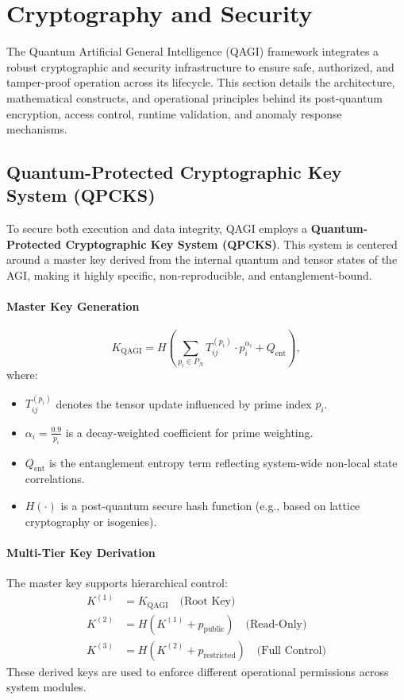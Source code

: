 \documentclass{article}
\theoremstyle{plain}
\theoremstyle{claimstyle}
\begin{document}
\section{Cryptography and Security}

The Quantum Artificial General Intelligence (QAGI) framework integrates a robust cryptographic and security infrastructure to ensure safe, authorized, and tamper-proof operation across its lifecycle. This section details the architecture, mathematical constructs, and operational principles behind its post-quantum encryption, access control, runtime validation, and anomaly response mechanisms.

\subsection{Quantum-Protected Cryptographic Key System (QPCKS)}

To secure both execution and data integrity, QAGI employs a \textbf{Quantum-Protected Cryptographic Key System (QPCKS)}. This system is centered around a master key derived from the internal quantum and tensor states of the AGI, making it highly specific, non-reproducible, and entanglement-bound.

\paragraph{Master Key Generation}
\begin{equation}
K_{\text{QAGI}} = H\left( \sum_{p_i \in P_N} T_{ij}^{(p_i)} \cdot p_i^{\alpha_i} + Q_{\text{ent}} \right),
\end{equation}
where:
\begin{itemize}
    \item \( T_{ij}^{(p_i)} \) denotes the tensor update influenced by prime index \( p_i \).
    \item \( \alpha_i = \frac{0.9}{p_i} \) is a decay-weighted coefficient for prime weighting.
    \item \( Q_{\text{ent}} \) is the entanglement entropy term reflecting system-wide non-local state correlations.
    \item \( H(\cdot) \) is a post-quantum secure hash function (e.g., based on lattice cryptography or isogenies).
\end{itemize}

\paragraph{Multi-Tier Key Derivation}
The master key supports hierarchical control:
\begin{align}
K^{(1)} &= K_{\text{QAGI}} \quad \text{(Root Key)} \\
K^{(2)} &= H(K^{(1)} + p_{\text{public}}) \quad \text{(Read-Only)} \\
K^{(3)} &= H(K^{(2)} + p_{\text{restricted}}) \quad \text{(Full Control)}
\end{align}
These derived keys are used to enforce different operational permissions across system modules.
\end{document}
